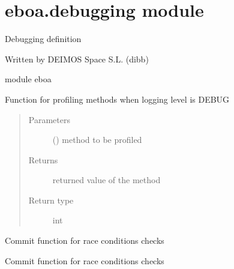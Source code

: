 \section{eboa.debugging module}
\label{\detokenize{eboa:module-eboa.debugging}}\label{\detokenize{eboa:eboa-debugging-module}}
Debugging definition

Written by DEIMOS Space S.L. (dibb)

module eboa

\begin{fulllineitems}
\label{\detokenize{eboa:eboa.debugging.debug}}
Function for profiling methods when logging level is DEBUG
\begin{quote}\begin{description}
\item[{Parameters}] \leavevmode
{} () \textendash{} method to be profiled

\item[{Returns}] \leavevmode
returned value of the method

\item[{Return type}] \leavevmode
int

\end{description}\end{quote}

\end{fulllineitems}


\begin{fulllineitems}
\label{\detokenize{eboa:eboa.debugging.race_condition}}
Commit function for race conditions checks

\end{fulllineitems}


\begin{fulllineitems}
\label{\detokenize{eboa:eboa.debugging.race_condition2}}
Commit function for race conditions checks

\end{fulllineitems}



